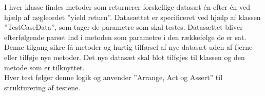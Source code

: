 I hver klasse findes metoder som returnerer forskellige datasæt én efter én ved hjælp af nøgleordet 
”yield return”. Datasættet er specificeret ved hjælp af klassen ”TestCaseData”, som tager de parametre 
som skal testes. Datasættet bliver efterfølgende parset ind i metoden som parametre i den rækkefølge de er sat.\\

Denne tilgang sikre få metoder og hurtig tilførsel af nye datasæt uden af fjerne eller tilføje nye metoder. 
Det nye datasæt skal blot tilføjes til klassen og den metode som er tilknyttet.\\

Hver test følger denne logik og anvender ”Arrange, Act og Assert” til strukturering af testene. 



